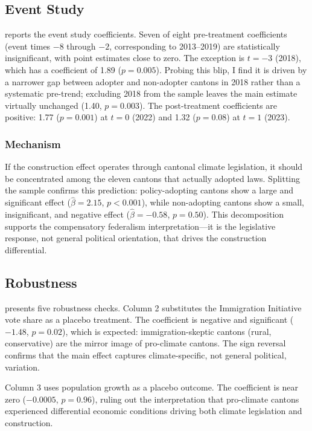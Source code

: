 \documentclass[12pt]{article}
\begin{document}


\subsection{Event Study}

 reports the event study coefficients. Seven of eight pre-treatment coefficients (event times $-8$ through $-2$, corresponding to 2013--2019) are statistically insignificant, with point estimates close to zero. The exception is $t = -3$ (2018), which has a coefficient of 1.89 ($p = 0.005$). Probing this blip, I find it is driven by a narrower gap between adopter and non-adopter cantons in 2018 rather than a systematic pre-trend; excluding 2018 from the sample leaves the main estimate virtually unchanged (1.40, $p = 0.003$). The post-treatment coefficients are positive: 1.77 ($p = 0.001$) at $t = 0$ (2022) and 1.32 ($p = 0.08$) at $t = 1$ (2023).

\subsubsection*{Mechanism} If the construction effect operates through cantonal climate legislation, it should be concentrated among the eleven cantons that actually adopted laws. Splitting the sample confirms this prediction: policy-adopting cantons show a large and significant effect ($\hat{\beta} = 2.15$, $p < 0.001$), while non-adopting cantons show a small, insignificant, and negative effect ($\hat{\beta} = -0.58$, $p = 0.50$). This decomposition supports the compensatory federalism interpretation---it is the legislative response, not general political orientation, that drives the construction differential.



\subsection{Robustness}

 presents five robustness checks. Column 2 substitutes the Immigration Initiative vote share as a placebo treatment. The coefficient is negative and significant ($-1.48$, $p = 0.02$), which is expected: immigration-skeptic cantons (rural, conservative) are the mirror image of pro-climate cantons. The sign reversal confirms that the main effect captures climate-specific, not general political, variation.

Column 3 uses population growth as a placebo outcome. The coefficient is near zero ($-0.0005$, $p = 0.96$), ruling out the interpretation that pro-climate cantons experienced differential economic conditions driving both climate legislation and construction.
\end{document}

